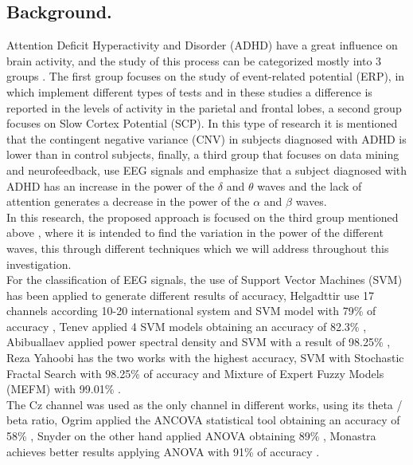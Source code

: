 \documentclass[letterpaper,12pt,openright,oneside]{article}
\begin{document}
\subsection{Background.}
Attention Deficit Hyperactivity and Disorder (ADHD) have a great influence on brain activity, and the study of this process can be categorized mostly into 3 groups \cite{Yag1}. The first group focuses on the study of event-related potential (ERP), in which implement different types of tests and in these studies a difference is reported in the levels of activity in the parietal and frontal lobes, a second group focuses on Slow Cortex Potential (SCP). In this type of research it is mentioned that the contingent negative variance (CNV) in subjects diagnosed with ADHD is lower than in control subjects, finally, a third group that focuses on data mining and neurofeedback, use EEG signals and emphasize that a subject diagnosed with ADHD has an increase in the power of the $\delta$ and $\theta$ waves and the lack of attention generates a decrease in the power of the $\alpha$ and $\beta$ waves.\\

In this research, the proposed approach is focused on the third group mentioned above \cite{Yag1}, where it is intended to find the variation in the power of the different waves, this through different techniques which we will address throughout this investigation.\\


For the classification of EEG signals, the use of Support Vector Machines (SVM) has been applied to generate different results of accuracy, Helgadttir use 17 channels according 10-20 international system and SVM model with 79\% of accuracy \cite{hel}, Tenev applied 4 SVM models obtaining an accuracy of 82.3\% \cite{Tenv}, Abibuallaev applied power spectral density and SVM with a result of 98.25\% , Reza Yahoobi has the two works with the highest accuracy, SVM with Stochastic Fractal Search with 98.25\% of accuracy and Mixture of Expert Fuzzy Models (MEFM) with 99.01\% \cite{Yag1} \cite{Yag2}.\\

The Cz channel was used as the only channel in different works, using its theta / beta ratio, Ogrim applied the ANCOVA statistical tool obtaining an accuracy of 58\% \cite{OGRIM}, Snyder on the other hand applied ANOVA obtaining 89\% \cite{SNYDER}, Monastra achieves better results applying ANOVA with 91\% of accuracy \cite{Monastra}.\\
\end{document}
